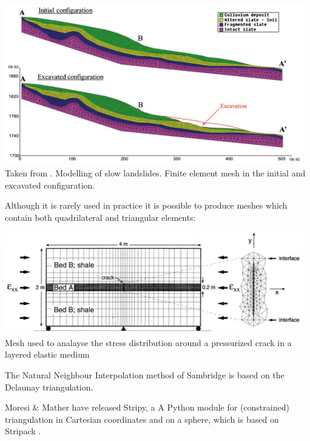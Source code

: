 \begin{center}
\includegraphics[width=13cm]{images/meshes/fegh14}\\
{\captionfont Taken from \cite{fegh14}. Modelling of slow
landslides. Finite element mesh in the initial and excavated configuration.}
\end{center}

Although it is rarely used in practice it is possible to produce meshes which contain 
both quadrilateral and triangular elements:
\begin{center}
\includegraphics[width=13cm]{images/meshes/fige95}\\
{\captionfont Mesh used to analayse the stress distribution around a pressurized crack in a layered 
elastic medium \cite{fige95}}
\end{center}

\Literature {}

\begin{remark} 
The Natural Neighbour Interpolation method of Sambridge \etal \cite{sabm95,sabm96} is based on the Delaunay triangulation.
\end{remark}

\begin{remark} 
Moresi \& Mather \cite{moma19} have released Stripy, a A Python module for (constrained) triangulation
in Cartesian coordinates and on a sphere, which is based on Stripack \cite{renk96,renk97}.
\end{remark}

